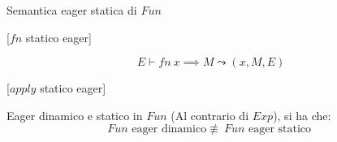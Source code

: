 \documentclass[a4paper,11pt]{report}
\begin{document}
\begin{defbox}[colback=DeepGreenLight, colframe=DeepGreen, colbacktitle=DeepGreen]{Semantica eager statica di \( Fun \)}{}
    \begin{center}
    [\( fn \) statico eager]
\end{center}
\vspace{-1em}
    \[  E \vdash fn \ x \implies M \leadsto (x, M, E)\]

\begin{center}
    [\( apply \) statico eager]
\end{center}
\vspace{-2.3em}
\begin{prooftree}
\end{prooftree}

\end{defbox}


\begin{lemmabox}{Eager dinamico e statico in \( Fun \)}{}
    (Al contrario di \( Exp \)), si ha che:
    \[ Fun \text{ eager dinamico} \not\equiv \ Fun \text{ eager statico } \]
\end{lemmabox}
\end{document}
